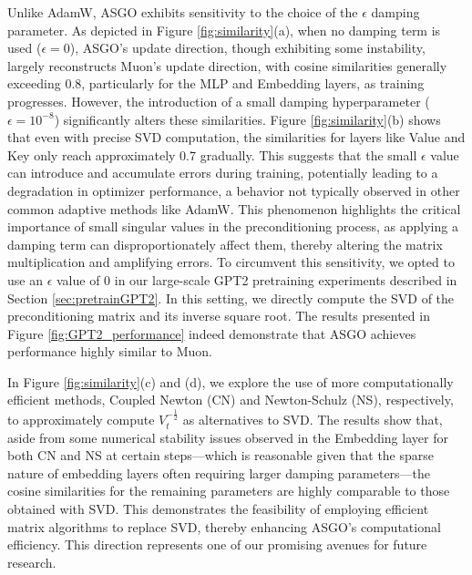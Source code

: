 \documentclass{article}
\theoremstyle{remark}
\begin{document}
Unlike AdamW, ASGO exhibits sensitivity to the choice of the $\epsilon$ damping parameter. As depicted in Figure \ref{fig:similarity}(a), when no damping term is used ($\epsilon = 0$), ASGO's update direction, though exhibiting some instability, largely reconstructs Muon's update direction, with cosine similarities generally exceeding 0.8, particularly for the MLP and Embedding layers, as training progresses. However, the introduction of a small damping hyperparameter ($\epsilon = 10^{-8}$) significantly alters these similarities. Figure \ref{fig:similarity}(b) shows that even with precise SVD computation, the similarities for layers like Value and Key only reach approximately 0.7 gradually. This suggests that the small $\epsilon$ value can introduce and accumulate errors during training, potentially leading to a degradation in optimizer performance, a behavior not typically observed in other common adaptive methods like AdamW. This phenomenon highlights the critical importance of small singular values in the preconditioning process, as applying a damping term can disproportionately affect them, thereby altering the matrix multiplication and amplifying errors. To circumvent this sensitivity, we opted to use an $\epsilon$ value of 0 in our large-scale GPT2 pretraining experiments described in Section \ref{sec:pretrainGPT2}. In this setting, we directly compute the SVD of the preconditioning matrix and its inverse square root. The results presented in Figure \ref{fig:GPT2_performance} indeed demonstrate that ASGO achieves performance highly similar to Muon.

In Figure \ref{fig:similarity}(c) and (d), we explore the use of more computationally efficient methods, Coupled Newton (CN) and Newton-Schulz (NS), respectively, to approximately compute $V_t^{-\frac{1}{2}}$ as alternatives to SVD. The results show that, aside from some numerical stability issues observed in the Embedding layer for both CN and NS at certain steps—which is reasonable given that the sparse nature of embedding layers often requiring larger damping parameters—the cosine similarities for the remaining parameters are highly comparable to those obtained with SVD. This demonstrates the feasibility of employing efficient matrix algorithms to replace SVD, thereby enhancing ASGO's computational efficiency. This direction represents one of our promising avenues for future research.
\end{document}
